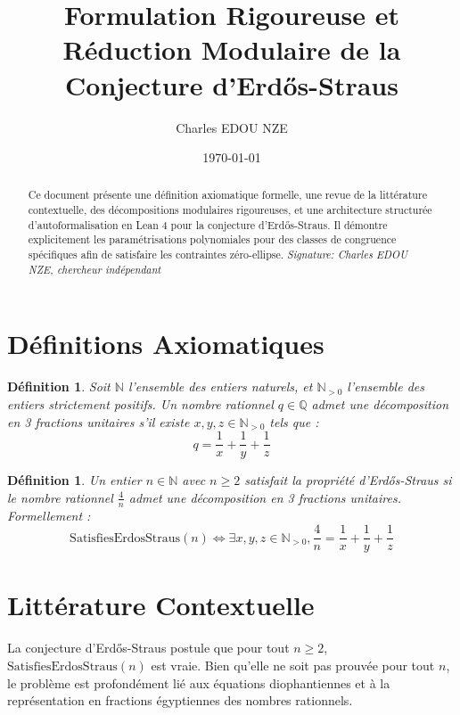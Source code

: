 \documentclass[12pt, a4paper]{article}
\title{Formulation Rigoureuse et R\'eduction Modulaire de la Conjecture d'Erd\H{o}s-Straus}
\author{Charles EDOU NZE}
\date{\today}
\newtheorem{definition}[theorem]{D\'efinition}
\begin{document}
\maketitle

\begin{abstract}
Ce document pr\'esente une d\'efinition axiomatique formelle, une revue de la litt\'erature contextuelle, des d\'ecompositions modulaires rigoureuses, et une architecture structur\'ee d'autoformalisation en Lean 4 pour la conjecture d'Erd\H{o}s-Straus. Il d\'emontre explicitement les param\'etrisations polynomiales pour des classes de congruence sp\'ecifiques afin de satisfaire les contraintes z\'ero-ellipse.
\vfill
\noindent \textit{Signature: Charles EDOU NZE, chercheur ind\'ependant}
\end{abstract}

\tableofcontents
\newpage

\section{D\'efinitions Axiomatiques}

\begin{definition}
Soit $\mathbb{N}$ l'ensemble des entiers naturels, et $\mathbb{N}_{>0}$ l'ensemble des entiers strictement positifs. Un nombre rationnel $q \in \mathbb{Q}$ admet une d\'ecomposition en 3 fractions unitaires s'il existe $x, y, z \in \mathbb{N}_{>0}$ tels que :
\[ q = \frac{1}{x} + \frac{1}{y} + \frac{1}{z} \]
\end{definition}

\begin{definition}
Un entier $n \in \mathbb{N}$ avec $n \ge 2$ satisfait la propri\'et\'e d'Erd\H{o}s-Straus si le nombre rationnel $\frac{4}{n}$ admet une d\'ecomposition en 3 fractions unitaires. Formellement :
\[ \text{SatisfiesErdosStraus}(n) \iff \exists x, y, z \in \mathbb{N}_{>0}, \frac{4}{n} = \frac{1}{x} + \frac{1}{y} + \frac{1}{z} \]
\end{definition}

\section{Litt\'erature Contextuelle}

La conjecture d'Erd\H{o}s-Straus postule que pour tout $n \ge 2$, $\text{SatisfiesErdosStraus}(n)$ est vraie. Bien qu'elle ne soit pas prouv\'ee pour tout $n$, le probl\`eme est profond\'ement li\'e aux \'equations diophantiennes et \`a la repr\'esentation en fractions \'egyptiennes des nombres rationnels.
\end{document}
